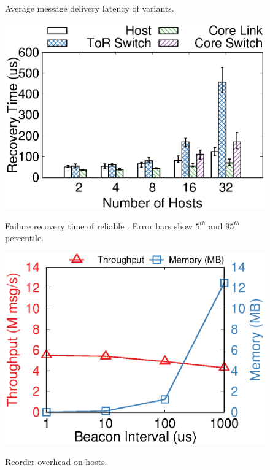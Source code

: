 \begin{figure}[t]
\begin{minipage}[]{.32\textwidth}
		\caption{Average message delivery latency of \sys{} variants.}
	\end{minipage}
	\hspace{0.01\textwidth}
	\begin{minipage}[]{.32\textwidth}
		\centering
		\includegraphics[width=\textwidth]{gnuplot/failure_recovery.eps}
		\caption{Failure recovery time of reliable \sys{}. Error bars show $5^{th}$ and $95^{th}$ percentile.}
		\label{fig:failure-recovery}
		\includegraphics[width=\textwidth]{gnuplot/reorder_receiver.eps}
		\caption{Reorder overhead on hosts.}
		\label{fig:reorder-overhead}
	\end{minipage}
	\vspace{-10pt}
\end{figure}


